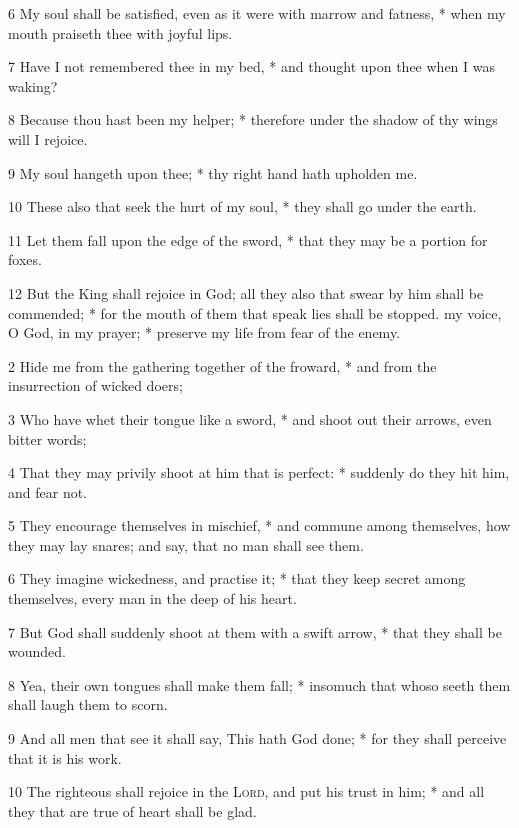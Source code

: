 6 My soul shall be satisfied, even as it were with marrow and fatness, * when my mouth praiseth thee with joyful lips.\par
7 Have I not remembered thee in my bed, * and thought upon thee when I was waking?\par
8 Because thou hast been my helper; * therefore under the shadow of thy wings will I rejoice.\par
9 My soul hangeth upon thee; * thy right hand hath upholden me.\par
10 These also that seek the hurt of my soul, * they shall go under the earth.\par
11 Let them fall upon the edge of the sword, * that they may be a portion for foxes.\par
12 But the King shall rejoice in God; all they also that swear by him shall be commended; * for the mouth of them that speak lies shall be stopped.
 my voice, O God, in my prayer; * preserve my life from fear of the enemy.\par
2 Hide me from the gathering together of the froward, * and from the insurrection of wicked doers;\par
3 Who have whet their tongue like a sword, * and shoot out their arrows, even bitter words;\par
4 That they may privily shoot at him that is perfect: * suddenly do they hit him, and fear not.\par
5 They encourage themselves in mischief, * and commune among themselves, how they may lay snares; and say, that no man shall see them.\par
6 They imagine wickedness, and practise it; * that they keep secret among themselves, every man in the deep of his heart.\par
7 But God shall suddenly shoot at them with a swift arrow, * that they shall be wounded.\par
8 Yea, their own tongues shall make them fall; * insomuch that whoso seeth them shall laugh them to scorn.\par
9 And all men that see it shall say, This hath God done; * for they shall perceive that it is his work.\par
10 The righteous shall rejoice in the {\textsc{Lord}}, and put his trust in him; * and all they that are true of heart shall be glad.
